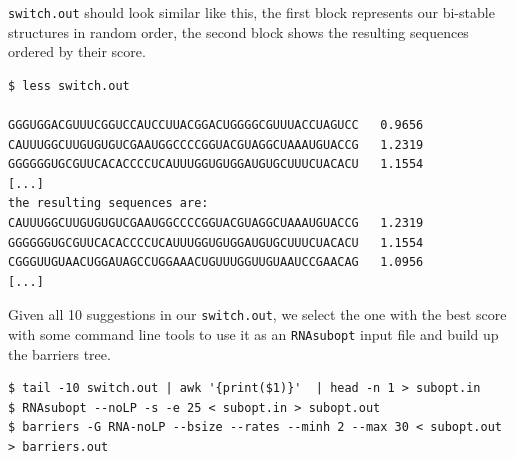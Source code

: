 \documentclass[]{article}
\begin{document}
\texttt{switch.out} should look similar like this, the first block
represents our bi-stable structures in random order, the second block
shows the resulting sequences ordered by their score.

\begin{verbatim}
$ less switch.out

GGGUGGACGUUUCGGUCCAUCCUUACGGACUGGGGCGUUUACCUAGUCC   0.9656
CAUUUGGCUUGUGUGUCGAAUGGCCCCGGUACGUAGGCUAAAUGUACCG   1.2319
GGGGGGUGCGUUCACACCCCUCAUUUGGUGUGGAUGUGCUUUCUACACU   1.1554
[...]
the resulting sequences are:
CAUUUGGCUUGUGUGUCGAAUGGCCCCGGUACGUAGGCUAAAUGUACCG   1.2319
GGGGGGUGCGUUCACACCCCUCAUUUGGUGUGGAUGUGCUUUCUACACU   1.1554
CGGGUUGUAACUGGAUAGCCUGGAAACUGUUUGGUUGUAAUCCGAACAG   1.0956
[...]
\end{verbatim}

Given all 10 suggestions in our \texttt{switch.out}, we select the one
with the best score with some command line tools to use it as an
\texttt{RNAsubopt} input file and build up the barriers tree.

\begin{verbatim}
$ tail -10 switch.out | awk '{print($1)}'  | head -n 1 > subopt.in
$ RNAsubopt --noLP -s -e 25 < subopt.in > subopt.out
$ barriers -G RNA-noLP --bsize --rates --minh 2 --max 30 < subopt.out > barriers.out
\end{verbatim}
\end{document}
